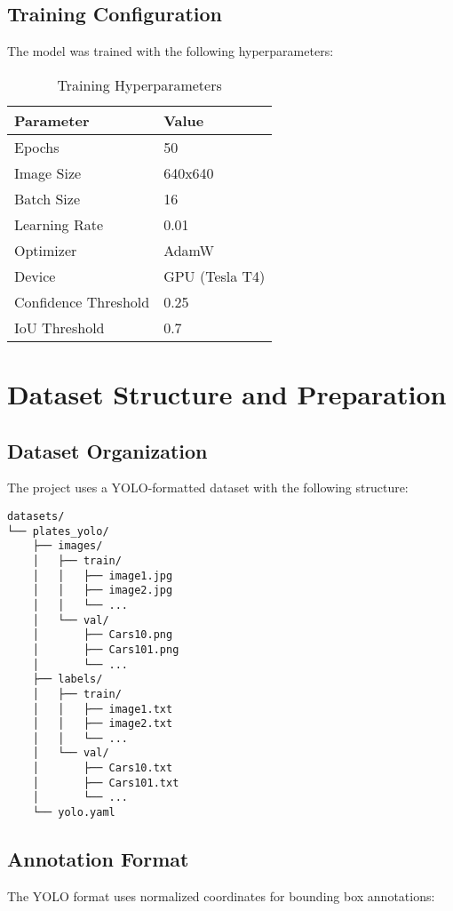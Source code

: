 \documentclass[12pt,a4paper]{article}
\begin{document}
\subsection{Training Configuration}
The model was trained with the following hyperparameters:

\begin{table}[H]
\centering
\begin{tabular}{|l|l|}
\hline
\textbf{Parameter} & \textbf{Value} \\
\hline
Epochs & 50 \\
Image Size & 640x640 \\
Batch Size & 16 \\
Learning Rate & 0.01 \\
Optimizer & AdamW \\
Device & GPU (Tesla T4) \\
Confidence Threshold & 0.25 \\
IoU Threshold & 0.7 \\
\hline
\end{tabular}
\caption{Training Hyperparameters}
\end{table}

\section{Dataset Structure and Preparation}

\subsection{Dataset Organization}
The project uses a YOLO-formatted dataset with the following structure:

\begin{lstlisting}[caption=Dataset Directory Structure]
datasets/
└── plates_yolo/
    ├── images/
    │   ├── train/
    │   │   ├── image1.jpg
    │   │   ├── image2.jpg
    │   │   └── ...
    │   └── val/
    │       ├── Cars10.png
    │       ├── Cars101.png
    │       └── ...
    ├── labels/
    │   ├── train/
    │   │   ├── image1.txt
    │   │   ├── image2.txt
    │   │   └── ...
    │   └── val/
    │       ├── Cars10.txt
    │       ├── Cars101.txt
    │       └── ...
    └── yolo.yaml
\end{lstlisting}

\subsection{Annotation Format}
The YOLO format uses normalized coordinates for bounding box annotations:
\end{document}
